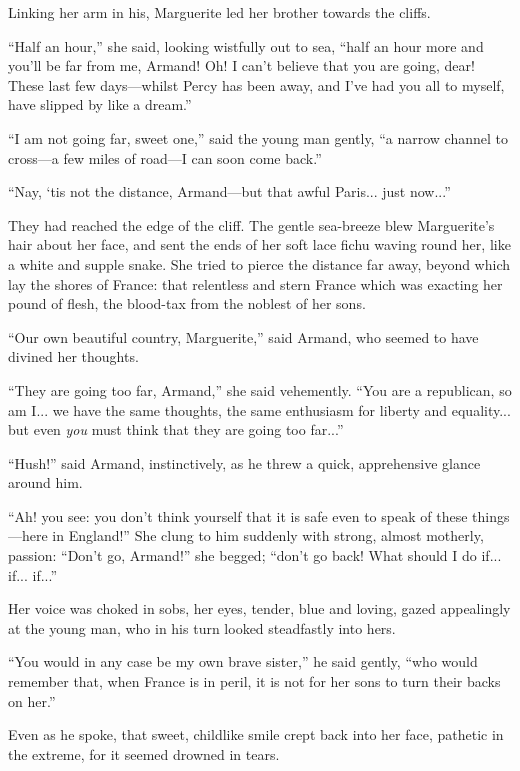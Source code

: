 Linking her arm in his, Marguerite led her brother towards the cliffs.

\enquote{Half an hour,} she said, looking wistfully out to sea, \enquote{half an hour more and you'll be far from me, Armand! Oh! I can't believe that you are going, dear! These last few days---whilst Percy has been away, and I've had you all to myself, have slipped by like a dream.}

\enquote{I am not going far, sweet one,} said the young man gently, \enquote{a narrow channel to cross---a few miles of road---I can soon come back.}

\enquote{Nay, `tis not the distance, Armand---but that awful Paris... just now...}

They had reached the edge of the cliff. The gentle sea-breeze blew Marguerite's hair about her face, and sent the ends of her soft lace fichu waving round her, like a white and supple snake. She tried to pierce the distance far away, beyond which lay the shores of France: that relentless and stern France which was exacting her pound of flesh, the blood-tax from the noblest of her sons.

\enquote{Our own beautiful country, Marguerite,} said Armand, who seemed to have divined her thoughts.

\enquote{They are going too far, Armand,} she said vehemently. \enquote{You are a republican, so am I... we have the same thoughts, the same enthusiasm for liberty and equality... but even \textit{you} must think that they are going too far...}

\enquote{Hush!\longdash} said Armand, instinctively, as he threw a quick, apprehensive glance around him.

\enquote{Ah! you see: you don't think yourself that it is safe even to speak of these things---here in England!} She clung to him suddenly with strong, almost motherly, passion: \enquote{Don't go, Armand!} she begged; \enquote{don't go back! What should I do if... if... if...}

Her voice was choked in sobs, her eyes, tender, blue and loving, gazed appealingly at the young man, who in his turn looked steadfastly into hers.

\enquote{You would in any case be my own brave sister,} he said gently, \enquote{who would remember that, when France is in peril, it is not for her sons to turn their backs on her.}

Even as he spoke, that sweet, childlike smile crept back into her face, pathetic in the extreme, for it seemed drowned in tears.

